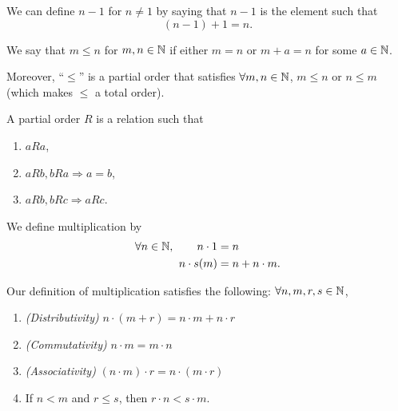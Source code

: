 \begin{definition}[Predecessor]
    We can define $n-1$ for $n\neq 1$ by saying that $n-1$ is the element such that
    \[(n-1) + 1 = n.\]
\end{definition}

\begin{definition}[Ordering]
    We say that $m\leq n$ for $m, n\in\mathbb N$ if either $m = n$ or $m + a = n$ for some $a\in \mathbb N$.

    Moreover, ``$\leq$'' is a partial order that satisfies $\forall m, n \in\mathbb N$, $m\leq n$ or $n\leq m$ (which makes $\leq$ a total order).
\end{definition}

\begin{definition}
    A partial order $R$ is a relation such that
    \begin{enumerate}
        \item $a R a$,
        \item $a R b, b R a \Rightarrow a = b$,
        \item $a R b, b R c \Rightarrow a R c$.
    \end{enumerate}
\end{definition}

\begin{definition}[Multiplication]
    We define multiplication by
    \begin{align*}
        \forall n\in\mathbb N, \qquad n\cdot 1 & = n             \\
        n\cdot s(m)                      & = n + n\cdot m.
    \end{align*}
\end{definition}

\begin{proposition}
    Our definition of multiplication satisfies the following: $\forall n, m, r, s\in\mathbb N$,
    \begin{enumerate}
        \item \emph{(Distributivity)} $n\cdot(m + r) = n\cdot m + n\cdot r$
        \item \emph{(Commutativity)} $n\cdot m = m\cdot n$
        \item \emph{(Associativity)} $(n\cdot m)\cdot r = n\cdot (m\cdot r)$
        \item If $n < m$ and $r \leq s$, then $r\cdot n < s\cdot m$.
    \end{enumerate}
\end{proposition}

